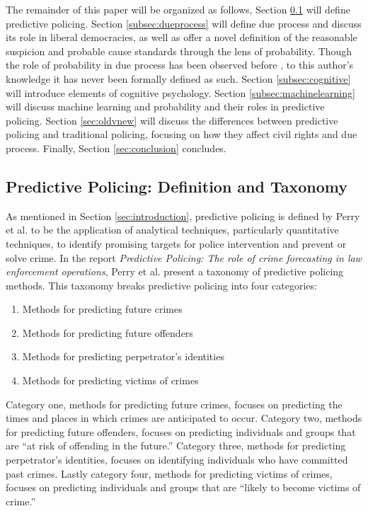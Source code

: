 \documentclass[12pt]{article} %
\begin{document}
The remainder of this paper will be organized as follows, Section \ref{subsec:predictivepolicing} will define predictive policing. Section \ref{subsec:dueprocess} will define due process and discuss its role in liberal democracies, as well as offer a novel definition of the reasonable suspicion and probable cause standards through the lens of probability. Though the role of probability in due process has been observed before \cite{ferguson2012predictive}, to this author's knowledge it has never been formally defined as such. Section \ref{subsec:cognitive} will introduce elements of cognitive psychology. Section \ref{subsec:machinelearning} will discuss machine learning and probability and their roles in predictive policing. Section \ref{sec:oldvnew} will discuss the differences between predictive policing and traditional policing, focusing on how they affect civil rights and due process. Finally, Section \ref{sec:conclusion} concludes.

\subsection{Predictive Policing: Definition and Taxonomy} \label{subsec:predictivepolicing}%

As mentioned in Section \ref{sec:introduction}, predictive policing is defined by Perry et al. to be the application of analytical techniques, particularly quantitative techniques, to identify promising targets for police intervention and prevent or solve crime. In the report \textit{Predictive Policing: The role of crime forecasting in law enforcement operations}, Perry et al. present a taxonomy of predictive policing methods. This taxonomy breaks predictive policing into four categories: \cite{perryetal}

\begin{enumerate}
\item Methods for predicting future crimes
\item Methods for predicting future offenders
\item Methods for predicting perpetrator's identities
\item Methods for predicting victims of crimes
\end{enumerate}

Category one, methods for predicting future crimes, focuses on predicting the times and places in which crimes are anticipated to occur. Category two, methods for predicting future offenders, focuses on predicting individuals and groups that are ``at risk of offending in the future.'' Category three, methods for predicting perpetrator's identities, focuses on identifying individuals who have committed past crimes. Lastly category four, methods for predicting victims of crimes, focuses on predicting individuals and groups that are ``likely to become victims of crime.''
\end{document}
